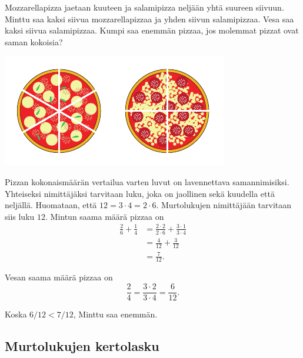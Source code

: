  \begin{esimerkki}
        Mozzarellapizza jaetaan kuuteen ja salamipizza neljään yhtä suureen siivuun. Minttu saa kaksi siivua mozzarellapizzaa ja yhden siivun salamipizzaa. Vesa saa kaksi siivua salamipizzaa. Kumpi saa enemmän pizzaa, jos molemmat pizzat ovat saman kokoisia?
        \begin{center}        
          \includegraphics[scale=1.0]{pictures/Kuva3-1-6-pizzat.pdf}
        \end{center}

\begin{esimratk}
        Pizzan kokonaismäärän vertailua varten luvut on lavennettava samannimisiksi. Yhteiseksi nimittäjäksi tarvitaan luku, joka on jaollinen sekä kuudella että neljällä. Huomataan, että $12 = 3\cdot 4 = 2\cdot 6$. Murtolukujen nimittäjään tarvitaan siis luku $12$.
        Mintun saama määrä pizzaa on
        \begin{align*}
           \frac{2}{6} + \frac{1}{4} &= \frac{2\cdot 2}{2\cdot 6} + \frac{3\cdot 1}{3\cdot 4} \\ 
	       							 &= \frac{4}{12}+\frac{3}{12} \\ 
	       							 &= \frac{7}{12}.
        \end{align*}
        
        Vesan saama määrä pizzaa on
        \[
            \frac{2}{4} =
            \frac{3\cdot 2}{3\cdot 4} =
            \frac{6}{12}.
        \]
\end{esimratk}        
        \begin{esimvast}
        Koska $6/12 < 7/12$, Minttu saa enemmän.
        \end{esimvast}
    \end{esimerkki}

    
\subsection*{Murtolukujen kertolasku}
    

